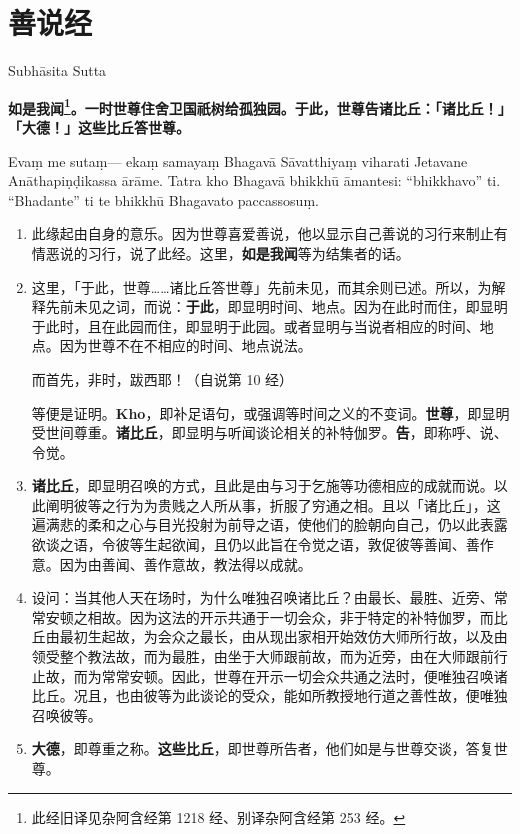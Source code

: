 \section{善说经}

\begin{center}Subhāsita Sutta\end{center}\vspace{1em}

\textbf{如是我闻\footnote{此经旧译见杂阿含经第 1218 经、别译杂阿含经第 253 经。}。一时世尊住舍卫国祇树给孤独园。于此，世尊告诸比丘：「诸比丘！」「大德！」这些比丘答世尊。}

Evaṃ me sutaṃ— ekaṃ samayaṃ Bhagavā Sāvatthiyaṃ viharati Jetavane Anāthapiṇḍikassa ārāme. Tatra kho Bhagavā bhikkhū āmantesi: “bhikkhavo” ti. “Bhadante” ti te bhikkhū Bhagavato paccassosuṃ.

\begin{enumerate}\item 此缘起由自身的意乐。因为世尊喜爱善说，他以显示自己善说的习行来制止有情恶说的习行，说了此经。这里，\textbf{如是我闻}等为结集者的话。
\item 这里，「于此，世尊……诸比丘答世尊」先前未见，而其余则已述。所以，为解释先前未见之词，而说：\textbf{于此}，即显明时间、地点。因为在此时而住，即显明于此时，且在此园而住，即显明于此园。或者显明与当说者相应的时间、地点。因为世尊不在不相应的时间、地点说法。\begin{quoting}而首先，非时，跋西耶！（自说第 10 经）\end{quoting}等便是证明。\textbf{Kho}，即补足语句，或强调等时间之义的不变词。\textbf{世尊}，即显明受世间尊重。\textbf{诸比丘}，即显明与听闻谈论相关的补特伽罗。\textbf{告}，即称呼、说、令觉。
\item \textbf{诸比丘}，即显明召唤的方式，且此是由与习于乞施等功德相应的成就而说。以此阐明彼等之行为为贵贱之人所从事，折服了穷通之相。且以「诸比丘」，这遍满悲的柔和之心与目光投射为前导之语，使他们的脸朝向自己，仍以此表露欲谈之语，令彼等生起欲闻，且仍以此旨在令觉之语，敦促彼等善闻、善作意。因为由善闻、善作意故，教法得以成就。
\item 设问：当其他人天在场时，为什么唯独召唤诸比丘？由最长、最胜、近旁、常常安顿之相故。因为这法的开示共通于一切会众，非于特定的补特伽罗，而比丘由最初生起故，为会众之最长，由从现出家相开始效仿大师所行故，以及由领受整个教法故，而为最胜，由坐于大师跟前故，而为近旁，由在大师跟前行止故，而为常常安顿。因此，世尊在开示一切会众共通之法时，便唯独召唤诸比丘。况且，也由彼等为此谈论的受众，能如所教授地行道之善性故，便唯独召唤彼等。
\item \textbf{大德}，即尊重之称。\textbf{这些比丘}，即世尊所告者，他们如是与世尊交谈，答复世尊。\end{enumerate}

